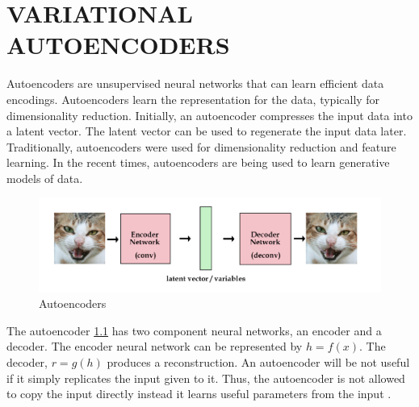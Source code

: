 \chapter{VARIATIONAL AUTOENCODERS}
\begin{onehalfspacing}
    Autoencoders are unsupervised neural networks that can learn efficient 
    data encodings. Autoencoders learn the representation for the data, 
    typically for dimensionality reduction. Initially, an autoencoder 
    compresses the input data into a latent vector. The latent vector can be 
    used to regenerate the input data later. Traditionally, autoencoders were 
    used for dimensionality reduction and feature learning. In the recent times, 
    autoencoders are being used to learn generative models of data.
    
    \begin{figure}[h]
        \centering
        \includegraphics[width=0.8\linewidth]{images/autoencoders.png}
        \caption{Autoencoders \cite{autoencoders_image}}
        \label{fig:autoencoders}
    \end{figure} 

    The autoencoder \ref{fig:autoencoders} has two component neural networks, 
    an encoder and a decoder. The encoder neural network can be represented by 
    $h = f(x)$.  The decoder, $r = g(h)$ produces a reconstruction.
    An autoencoder will be not useful if it simply replicates the input given 
    to it. Thus, the autoencoder is not allowed to copy the input directly 
    instead it learns useful parameters from the input  \cite{dlbook}. 

\end{onehalfspacing}